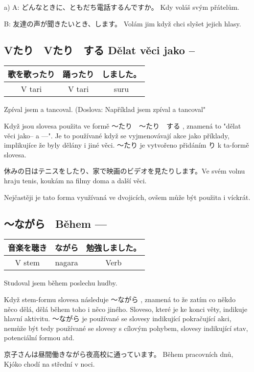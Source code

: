 a) A: 	どんなときに、ともだち電話するんですか。	Kdy voláš svým přátelům.

B: 友達の声が聞きたいとき、します。	Volám jim když chci slyšet jejich hlasy.

\subsection{Vたり　Vたり　する Dělat věci jako --}
\begin{center}
\begin{tabular}{||c|c|c||}
\hline
歌を歌ったり&踊ったり&しました。\\
\hline
V tari & V tari& suru\\
\hline
\end{tabular}
\end{center}
Zpíval jsem a tancoval. (Doslova: Například jsem zpíval a tancoval"

Když jsou slovesa použita ve formě 〜たり　〜たり　する		, znamená to "dělat věci jako-- a ---". Je to používané když se vyjmenovávají akce jako příklady, implikujíce že byly dělány i jiné věci. 〜たり	je vytvořeno přidáním り	 k ta-formě slovesa.

休みの日はテニスをしたり、家で映画のビデオを見たりします。Ve svém volnu hraju tenis, koukám na filmy doma a další věci.

Nejčastěji je tato forma využívaná ve dvojicích, ovšem může být použita i víckrát.


\subsection{〜ながら　Během ---}
\begin{center}
\begin{tabular}{||c|c||c||}
\hline
音楽を聴き&ながら&勉強しました。\\
\hline
V stem&nagara&Verb\\
\hline
\end{tabular}
\end{center}

Studoval jsem během poslechu hudby.

Když stem-formu slovesa následuje 	〜ながら	, znamená to že zatím co někdo něco dělá, dělá během toho i něco jiného. Sloveso, které je ke konci věty, indikuje hlavní aktivitu. 	〜ながら	je používané se slovesy indikující pokračující akci, nemůže být tedy používané se slovesy s cílovým pohybem, slovesy indikující stav, potenciální formou atd.


京子さんは昼間働きながら夜高校に通っています。	Během pracovních dnů, Kjóko chodí na střední v noci.






















